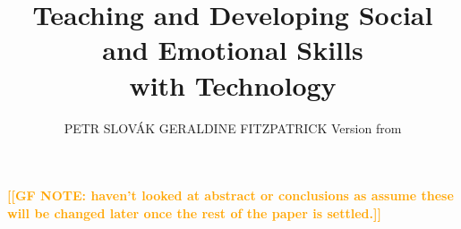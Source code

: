 \documentclass[prodmode,acmtochi]{acmsmall}
\newcommand{\Geraldine}[1]{\textrm{\textbf{\textcolor{Orange}{[[#1]]}}}}
\begin{document}



\title{Teaching and Developing Social and Emotional Skills \\ with Technology} 
\author{PETR SLOV\'{A}K %
 GERALDINE FITZPATRICK 
Version from \affil{ \today, \currenttime }
	}
        

\maketitle

\Geraldine{GF NOTE: haven't looked at abstract or conclusions as assume these will be changed later once the rest of the paper is settled.}
\end{document}
